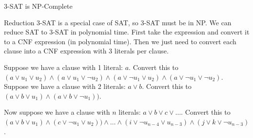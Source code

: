 \begin{frame}{3-SAT is NP-Complete}

  {
    \begin{block}{Reduction}
    3-SAT is a special case of SAT, so 3-SAT must be in NP.
    We can reduce SAT to 3-SAT in polynomial time.
    First take the expression and convert it to a CNF expression (in polynomial time).
    Then we just need to convert each clause into a CNF expression with 3 literals per clause.
    
    Suppose we have a clause with 1 literal: $a$.
    Convert this to $(a \vee u_1 \vee u_2) \wedge (a \vee u_1 \vee \neg u_2) \wedge (a \vee \neg u_1 \vee u_2) \wedge (a \vee \neg u_1 \vee \neg u_2)$.
    Suppose we have a clause with 2 literals: $a \vee b$.
    Convert this to $(a \vee b \vee u_1) \wedge (a \vee b \vee \neg u_1))$.
    
    Now suppose we have a clause with $n$ literals: $a \vee b \vee c \vee \ldots$.
    Convert this to $(a \vee b \vee u_1) \wedge (c \vee \neg u_1 \vee u_2)) \wedge \ldots \wedge (i \vee \neg u_{n-4} \vee u_{n-3}) \wedge (j \vee k \vee \neg u_{n-3})$.
  \end{block}}

\end{frame}